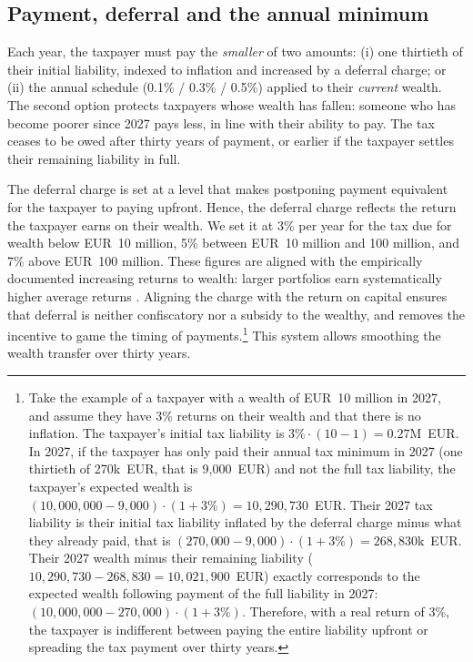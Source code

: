 \documentclass[../../main]{subfiles}
\begin{document}
\subsection{Payment, deferral and the annual minimum}

Each year, the taxpayer must pay the \emph{smaller} of two amounts: (i) one thirtieth of their initial liability, indexed to inflation and increased by a deferral charge; or (ii) the annual schedule (0.1\% / 0.3\% / 0.5\%) applied to their \emph{current} wealth. The second option protects taxpayers whose wealth has fallen: someone who has become poorer since 2027 pays less, in line with their ability to pay. The tax ceases to be owed after thirty years of payment, or earlier if the taxpayer settles their remaining liability in full.

The deferral charge is set at a level that makes postponing payment equivalent for the taxpayer to paying upfront.  
Hence, the deferral charge reflects %
the return the taxpayer earns on their wealth. 
We set it at 3\% per year for the tax due for wealth below EUR~10 million, 5\% between EUR~10 million and 100 million, and 7\% above EUR~100 million. These figures are aligned with the empirically documented increasing returns to wealth: larger portfolios earn systematically higher average returns %
\citep{WorldInequalityReport2022}. %
Aligning the charge with the return on capital ensures that deferral is neither confiscatory nor a subsidy to the wealthy, and removes the incentive to game the timing of payments.\footnote{Take the example of a taxpayer with a wealth of EUR~10 million in 2027, and assume they have 3\% returns on their wealth and that there is no inflation. The taxpayer's initial tax liability is $3\% \cdot (10-1) = 0.27$M~EUR. In 2027, if the taxpayer has only paid their annual tax minimum in 2027 (one thirtieth of 270k~EUR, that is 9,000~EUR) and not the full tax liability, the taxpayer's expected wealth is $(10,000,000 - 9,000) \cdot(1+3\%)=10,290,730$~EUR. Their 2027 tax liability is their initial tax liability inflated by the deferral charge minus what  they already paid, that is $(270,000-9,000) \cdot (1+3\%) = 268,830$k~EUR. Their 2027 wealth minus their remaining liability ($10,290,730-268,830=10,021,900$~EUR) exactly corresponds to the expected wealth following payment of the full liability in 2027: $(10,000,000-270,000)\cdot (1+3\%)$. Therefore, with a real return of 3\%, the taxpayer is indifferent between paying the entire liability upfront or spreading the tax payment over thirty years.} This system allows smoothing the wealth transfer over thirty years.
\end{document}
